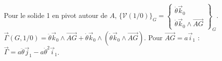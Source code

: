 \begin{corrigebox}
Pour le solide 1 en pivot autour de $A$,
                $\{\mathcal V(1/0)\}_G=\left\{\begin{array}{c}
                \dot\theta\vec k_0\\\dot\theta\vec k_0\wedge\overrightarrow{AG}
                \end{array}\right\}_G$.
$\vec\Gamma(G,1/0)=\ddot\theta\vec k_0\wedge\overrightarrow{AG}
                +\dot\theta\vec k_0\wedge(\dot\theta\vec k_0\wedge
                \overrightarrow{AG})$. Pour $\overrightarrow{AG}=a\vec i_1$ :
                $\vec\Gamma=a\ddot\theta\vec j_1-a\dot\theta^2\vec i_1$.
\end{corrigebox}
